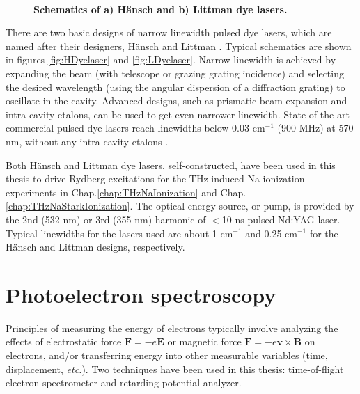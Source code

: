 \begin{figure}[H]
	
	\vspace{-0.5\baselineskip}
	\centering
	\captionsetup[subfloat]{captionskip=-2mm}
	\\
	\vspace{-3mm}
	\caption[Schematics of H\"{a}nsch and Littman dye lasers.]{{\bf Schematics of {\bf a)} H\"{a}nsch and {\bf b)} Littman dye lasers.}}
	\label{fig:Dyelasers}
	\vspace{-0.5\baselineskip}
	
\end{figure}

There are two basic designs of narrow linewidth pulsed dye lasers, which are named after their designers, H\"{a}nsch \cite{HanschDyelaser1972} and Littman \cite{LittmanDyelaser1978}. Typical schematics are shown in figures \ref{fig:HDyelaser} and \ref{fig:LDyelaser}. Narrow linewidth is achieved by expanding the beam (with telescope or grazing grating incidence) and selecting the desired wavelength (using the angular dispersion of a diffraction grating) to oscillate in the cavity. Advanced designs, such as prismatic beam expansion and intra-cavity etalons, can be used to get even narrower linewidth. State-of-the-art commercial pulsed dye lasers reach linewidths below 0.03 cm$^{-1}$ (900 MHz) at 570 nm, without any intra-cavity etalons \cite{CobraDyelaser,VistaDyelaser}.

Both H\"{a}nsch and Littman dye lasers, self-constructed, have been used in this thesis to drive Rydberg excitations for the THz induced Na ionization experiments in Chap.\@ \ref{chap:THzNaIonization} and Chap.\@ \ref{chap:THzNaStarkIonization}. The optical energy source, or pump, is provided by the 2nd (532 nm) or 3rd (355 nm) harmonic of $<$10 ns pulsed Nd:YAG laser. Typical linewidths for the lasers used are about 1 cm$^{-1}$ and 0.25 cm$^{-1}$ for the H\"{a}nsch and Littman designs, respectively. 

\section{Photoelectron spectroscopy}

Principles of measuring the energy of electrons typically involve analyzing the effects of electrostatic force $\bm{F}=-e \bm{E}$ or magnetic force $\bm{F}=-e \bm{v} \times \bm{B}$ on electrons, and/or transferring energy into other measurable variables (time, displacement, {\it etc.\@}). Two techniques have been used in this thesis: time-of-flight electron spectrometer and retarding potential analyzer.

